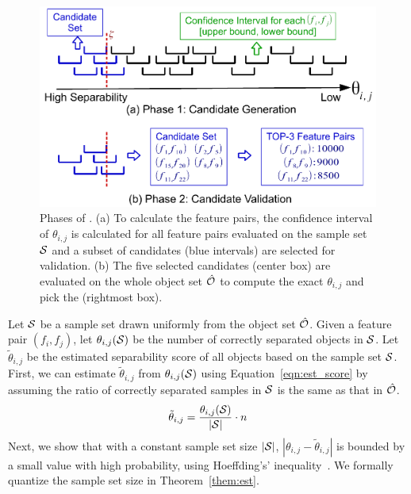 \begin{figure}[t!]
 \centering
 \vspace{-2mm}
 \includegraphics[width=\linewidth]{fig/sampling.pdf}
 \vspace{-9mm}
\caption{Phases of \sampling. (a) To calculate the \topthree feature pairs, the confidence interval of $\theta_{i,j}$ is calculated for all feature pairs evaluated on the sample set $\sss$ and a subset of candidates (blue intervals) are selected for validation. (b) The five selected candidates (center box) are evaluated on the whole object set $\hat{\oo}$ to compute the exact $\theta_{i,j}$ and pick the \topthree (rightmost box).}
\vspace{-5mm}
\label{fig:sampling}
\end{figure}

Let $\sss$ be a sample set drawn uniformly from the object set $\hat{\oo}$. Given a feature pair $(f_i,f_j)$, let $\theta_{i,j}(\sss)$ be the number of correctly separated objects in $\sss$. Let $\tilde{\theta}_{i,j}$ be the estimated separability score of all objects based on the sample set $\sss$. First, we can estimate $\tilde{\theta}_{i,j}$ from $\theta_{i,j}(\sss)$ using Equation~\ref{eqn:est_score} by assuming the ratio of correctly separated samples in $\sss$ is the same as that in $\hat{\oo}$.
\begin{equation}\label{eqn:est_score}
\tilde{\theta}_{i,j} = \frac{\theta_{i,j}(\sss)}{|\sss|} \cdot n
\end{equation}
\noindent Next, we show that with a constant sample set size $|\sss|$, $|\theta_{i,j}-\tilde{\theta}_{i,j}|$ is bounded by a small value with high probability, using Hoeffding's' inequality~\cite{hoeffding1963probability}. We formally quantize the sample set size in Theorem~\ref{them:est}.


